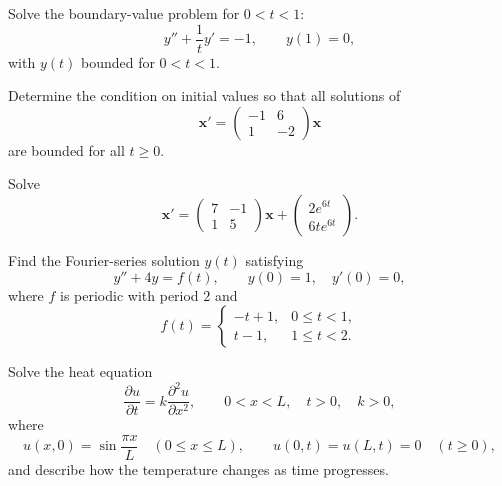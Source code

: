 \documentclass[11pt,oneside]{article}
\begin{document}
\begin{problem}
\begin{problemsubparts}
\item Solve the boundary-value problem for $0<t<1$:
\[
y''+\frac1t y'=-1,\qquad y(1)=0,
\]
with $y(t)$ bounded for $0<t<1$.
\item Determine the condition on initial values so that all solutions of
\[
\mathbf x'=\begin{pmatrix}-1&6\\1&-2\end{pmatrix}\mathbf x
\]
are bounded for all $t\ge0$.
\end{problemsubparts}
\end{problem}

\begin{problem}
Solve
\[
\mathbf x'=\begin{pmatrix}7&-1\\1&5\end{pmatrix}\mathbf x
+\begin{pmatrix}2e^{6t}\\6te^{6t}\end{pmatrix}.
\]
\end{problem}

\begin{problem}
Find the Fourier-series solution $y(t)$ satisfying
\[
y''+4y=f(t),\qquad y(0)=1,\quad y'(0)=0,
\]
where $f$ is periodic with period $2$ and
\[
f(t)=\begin{cases}-t+1,&0\le t<1,\\t-1,&1\le t<2.\end{cases}
\]
\end{problem}

\begin{problem}
Solve the heat equation
\[
\frac{\partial u}{\partial t}=k\frac{\partial^2u}{\partial x^2},
\qquad 0<x<L,\quad t>0,\quad k>0,
\]
where
\[
u(x,0)=\sin\frac{\pi x}{L}\quad(0\le x\le L),
\qquad u(0,t)=u(L,t)=0\quad(t\ge0),
\]
and describe how the temperature changes as time progresses.
\end{problem}
\end{document}
